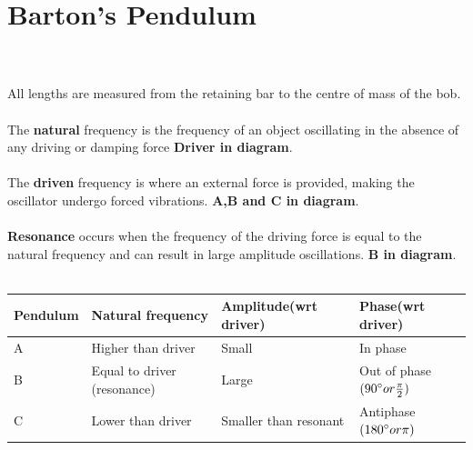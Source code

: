 \documentclass{article}[18pt]
\begin{document}
\section{Barton's Pendulum}

\\
\\
All lengths are measured from the retaining bar to the centre of mass of the bob.\\
\\
The \textbf{natural} frequency is the frequency of an object oscillating in the absence of any driving or damping force \textbf{Driver in diagram}.\\
\\
The \textbf{driven} frequency is where an external force is provided, making the oscillator undergo forced vibrations. \textbf{A,B and C in diagram}.\\
\\
\textbf{Resonance} occurs when the frequency of the driving force is equal to the natural frequency and can result in large amplitude oscillations. \textbf{B in diagram}.\\
\\



\begin{tabu} to \textwidth { | X[c] | X[c] | X[c] | X[c] | }
 \hline
\textbf{Pendulum}&\textbf{Natural frequency}&\textbf{Amplitude(wrt driver)}&\textbf{Phase(wrt driver)} \\
\hline
A&Higher than driver&Small&In phase\\
\hline
B&Equal to driver (resonance)&Large&Out of phase$(90\degree or \frac{\pi}{2})$\\
\hline
C&Lower than driver&Smaller than resonant&Antiphase$(180\degree or \pi)$\\
\hline
\end{tabu}
\end{document}
